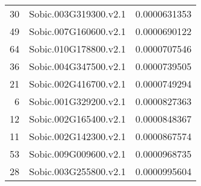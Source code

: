 \documentclass[12pt, a4paper]{article}
\begin{document}
\begin{table}[ht]
\begin{tabular}{rlr}
  30 & Sobic.003G319300.v2.1 & 0.0000631353 \\ 
  49 & Sobic.007G160600.v2.1 & 0.0000690122 \\ 
  64 & Sobic.010G178800.v2.1 & 0.0000707546 \\ 
  36 & Sobic.004G347500.v2.1 & 0.0000739505 \\ 
  21 & Sobic.002G416700.v2.1 & 0.0000749294 \\ 
  6 & Sobic.001G329200.v2.1 & 0.0000827363 \\ 
  12 & Sobic.002G165400.v2.1 & 0.0000848367 \\ 
  11 & Sobic.002G142300.v2.1 & 0.0000867574 \\ 
  53 & Sobic.009G009600.v2.1 & 0.0000968735 \\ 
  28 & Sobic.003G255800.v2.1 & 0.0000995604 \\ 
   \hline
\end{tabular}
\end{table}
\end{document}
